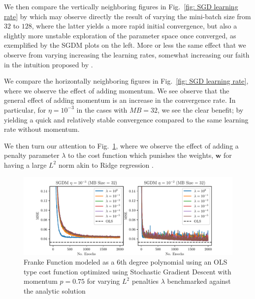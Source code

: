 \documentclass[reprint, english, nofootinbib]{revtex4-2}
\begin{document}
We then compare the vertically neighboring figures in Fig.~\ref{fig: SGD learning rate} by which may observe directly the result of varying the mini-batch size from $32$ to $128$, where the latter yields a more rapid initial convergence, but also a slightly more unstable exploration of the parameter space once converged, as exemplified by the SGDM plots on the left. More or less the same effect that we observe from varying increasing the learning rates, somewhat increasing our faith in the intuition proposed by \textcite{ManyBodyML}.

We compare the horizontally neighboring figures in Fig.~\ref{fig: SGD learning rate}, where we observe the effect of adding momentum. We see observe that the general effect of adding momentum is an increase in the convergence rate. In particular, for $\eta = 10^{-3}$ in the cases with $MB = 32$, we see the clear benefit; by yielding a quick and relatively stable convergence compared to the same learning rate without momentum.

We then turn our attention to Fig.~\ref{fig: SGD penalty}, where we observe the effect of adding a penalty parameter $\lambda$ to the cost function which punishes the weights, $\pmb w$ for having a large $L^2$ norm akin to Ridge regression \cite{4155_project_1}.
\begin{figure}
    \includegraphics[width=\columnwidth]{SGD_learning_penalty.pdf}
    \caption{\label{fig: SGD penalty}Franke Function modeled as a 6th degree polynomial using an OLS type cost function optimized using Stochastic Gradient Descent with momentum $p=0.75$ for varying $L^2$ penalties $\lambda$ benchmarked against the analytic solution}
\end{figure}
\end{document}
